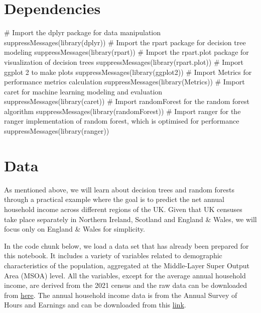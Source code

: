 \documentclass[
  letterpaper,
  DIV=11,
  numbers=noendperiod]{scrreprt}
\newenvironment{Shaded}{\begin{snugshade}}{\end{snugshade}}
\newcommand{\CommentTok}[1]{\textcolor[rgb]{0.37,0.37,0.37}{#1}}
\newcommand{\FunctionTok}[1]{\textcolor[rgb]{0.28,0.35,0.67}{#1}}
\newcommand{\NormalTok}[1]{\textcolor[rgb]{0.00,0.23,0.31}{#1}}
\begin{document}
\hypertarget{dependencies-5}{%
\section{Dependencies}\label{dependencies-5}}

\begin{Shaded}
\begin{Highlighting}[]
\CommentTok{\# Import the dplyr package for data manipulation}
\FunctionTok{suppressMessages}\NormalTok{(}\FunctionTok{library}\NormalTok{(dplyr))}
\CommentTok{\# Import the rpart package for decision tree modeling}
\FunctionTok{suppressMessages}\NormalTok{(}\FunctionTok{library}\NormalTok{(rpart))}
\CommentTok{\# Import the rpart.plot package for visualization of decision trees}
\FunctionTok{suppressMessages}\NormalTok{(}\FunctionTok{library}\NormalTok{(rpart.plot))}
\CommentTok{\# Import ggplot 2 to make plots}
\FunctionTok{suppressMessages}\NormalTok{(}\FunctionTok{library}\NormalTok{(ggplot2))}
\CommentTok{\# Import Metrics for performance metrics calculation}
\FunctionTok{suppressMessages}\NormalTok{(}\FunctionTok{library}\NormalTok{(Metrics))}
\CommentTok{\# Import caret for machine learning modeling and evaluation}
\FunctionTok{suppressMessages}\NormalTok{(}\FunctionTok{library}\NormalTok{(caret))}
\CommentTok{\# Import randomForest for the random forest algorithm}
\FunctionTok{suppressMessages}\NormalTok{(}\FunctionTok{library}\NormalTok{(randomForest))}
\CommentTok{\# Import ranger for the ranger implementation of random forest, which is optimised for performance}
\FunctionTok{suppressMessages}\NormalTok{(}\FunctionTok{library}\NormalTok{(ranger))}
\end{Highlighting}
\end{Shaded}

\hypertarget{data-5}{%
\section{Data}\label{data-5}}

As mentioned above, we will learn about decision trees and random
forests through a practical example where the goal is to predict the net
annual household income across different regions of the UK. Given that
UK censuses take place separately in Northern Ireland, Scotland and
England \& Wales, we will focus only on England \& Wales for simplicity.

In the code chunk below, we load a data set that has already been
prepared for this notebook. It includes a variety of variables related
to demographic characteristics of the population, aggregated at the
Middle-Layer Super Output Area (MSOA) level. All the variables, except
for the average annual household income, are derived from the 2021
census and the raw data can be downloaded from
\href{https://www.nomisweb.co.uk/census/2021/bulk}{here}. The annual
household income data is from the Annual Survey of Hours and Earnings
and can be downloaded from this
\href{https://www.ons.gov.uk/employmentandlabourmarket/peopleinwork/earningsandworkinghours/datasets/smallareaincomeestimatesformiddlelayersuperoutputareasenglandandwales}{link}.
\end{document}
